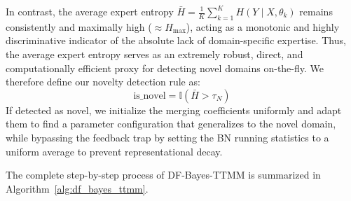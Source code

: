 \documentclass{article}
\theoremstyle{plain}
\theoremstyle{definition}
\theoremstyle{remark}
\begin{document}
In contrast, the average expert entropy $\bar{H} = \frac{1}{K} \sum_{k=1}^K H(Y \mid X, \theta_k)$
remains consistently and maximally high ($\approx H_{\max}$), acting as a monotonic and highly
discriminative indicator of the absolute lack of domain-specific expertise. Thus, the average expert
entropy serves as an extremely robust, direct, and computationally efficient proxy for detecting
novel domains on-the-fly. We therefore define our novelty detection rule as:
\begin{equation}
    \text{is\_novel} = \mathbb{I}(\bar{H} > \tau_N)
\end{equation}
If detected as novel, we initialize the merging coefficients uniformly and adapt them to find a
parameter configuration that generalizes to the novel domain, while bypassing the feedback trap by
setting the BN running statistics to a uniform average to prevent representational decay.

The complete step-by-step process of DF-Bayes-TTMM is summarized in
Algorithm~\ref{alg:df_bayes_ttmm}.
\end{document}
